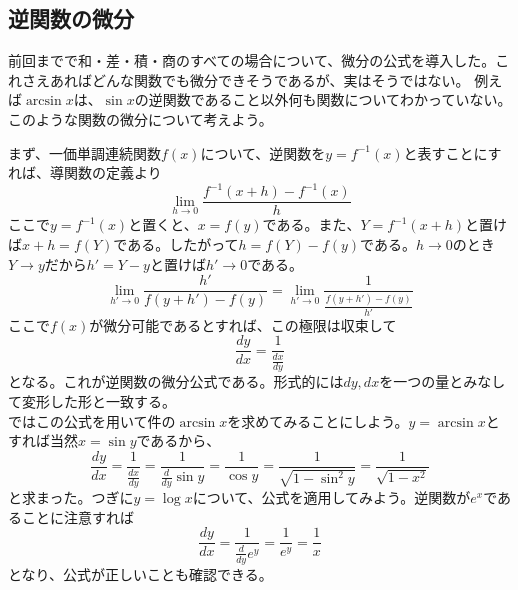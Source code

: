 \documentclass[a4j,dvipdfmx]{jsarticle}
\begin{document}
            \subsection{逆関数の微分}
                前回までで和・差・積・商のすべての場合について、微分の公式を導入した。これさえあればどんな関数でも微分できそうであるが、実はそうではない。
                例えば$\arcsin x$は、$\sin x$の逆関数であること以外何も関数についてわかっていない。このような関数の微分について考えよう。

                まず、一価単調連続関数$f(x)$について、逆関数を$y=f^{-1}(x)$と表すことにすれば、導関数の定義より
                \begin{equation}
                    \lim_{h\to 0}\frac{f^{-1}(x+h)-f^{-1}(x)}{h}
                \end{equation}
                ここで$y=f^{-1}(x)$と置くと、$x=f(y)$である。また、$Y=f^{-1}(x+h)$と置けば$x+h=f(Y)$である。したがって$h=f(Y)-f(y)$である。$h\to 0$のとき$Y\to y$だから$h'=Y-y$と置けば$h'\to 0$である。
                \begin{equation}
                    \lim_{h'\to 0}\frac{h'}{f(y+h')-f(y)}=\lim_{h'\to 0}\frac{1}{\displaystyle\frac{f(y+h')-f(y)}{h'}}
                \end{equation}
                ここで$f(x)$が微分可能であるとすれば、この極限は収束して
                \begin{equation}
                    \frac{dy}{dx}=\frac{1}{\displaystyle\frac{dx}{dy}}\label{eq:逆関数の微分公式}
                \end{equation}
                となる。これが逆関数の微分公式である。形式的には$dy,dx$を一つの量とみなして変形した形と一致する。\\

                ではこの公式を用いて件の$\arcsin x$を求めてみることにしよう。$y=\arcsin x$とすれば当然$x=\sin y$であるから、
                \begin{equation}
                    \frac{dy}{dx}=\frac{1}{\displaystyle\frac{dx}{dy}}=\frac{1}{\displaystyle\frac{d}{dy}\sin y}=\frac{1}{\cos y}=\frac{1}{\sqrt{1-\sin^2 y}}=\frac{1}{\sqrt{1-x^2}}
                \end{equation}
                と求まった。つぎに$y=\log x$について、公式を適用してみよう。逆関数が$e^x$であることに注意すれば
                \begin{equation}
                    \frac{dy}{dx}=\frac{1}{\frac{d}{dy}e^{y}}=\frac{1}{e^y}=\frac{1}{x}
                \end{equation}
                となり、公式が正しいことも確認できる。
            \clearpage
\end{document}
